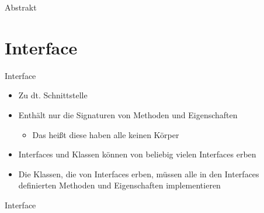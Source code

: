 \begin{frame}{Abstrakt}
	
\end{frame}

\section{Interface}
\begin{frame}{Interface}
	\begin{itemize}
		\item Zu dt. Schnittstelle
		\item Enthält nur die \alert{Signaturen} von Methoden und Eigenschaften
		\begin{itemize}
			\item Das heißt diese haben alle keinen Körper
		\end{itemize}
		\item Interfaces und Klassen können von beliebig vielen Interfaces erben
		\item Die Klassen, die von Interfaces erben, müssen alle in den Interfaces definierten Methoden und Eigenschaften implementieren
	\end{itemize}
\end{frame}

\begin{frame}{Interface}
	
\end{frame}

